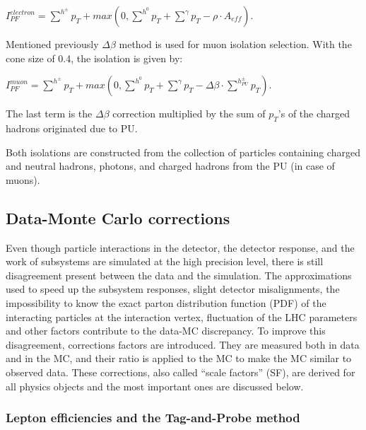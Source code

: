 $I^{electron}_{PF} = \sum^{h^\pm} p_T + max (0, \sum^{h^0} p_T + \sum^\gamma p_T - \rho \cdot A_{eff})$.

Mentioned previously $\Delta \beta$ method is used for muon isolation selection. With the cone size of 0.4, the isolation is given by:

$I^{muon}_{PF} = \sum^{h^\pm} p_T + max (0, \sum^{h^0} p_T + \sum^\gamma p_T - \Delta \beta  \cdot  \sum^{h^\pm_{PU}} p_T)$.

\noindent The last term is the $\Delta \beta$ correction multiplied by the sum of $p_T$'s of the charged hadrons originated due to PU.

Both isolations are constructed from the collection of particles containing charged and neutral hadrons, photons, and charged hadrons from the PU (in case of muons).


\subsection{Data-Monte Carlo corrections}\label{sec:data_mc}

Even though particle interactions in the detector, the detector response, and the work of subsystems are simulated at the high precision level, there is still disagreement present between the data and the simulation. The approximations used to speed up the subsystem responses, slight detector misalignments, the impossibility to know the exact parton distribution function (PDF) of the interacting particles at the interaction vertex, fluctuation of the LHC parameters and other factors contribute to the data-MC discrepancy. To improve this disagreement, corrections factors are introduced. They are measured both in data and in the MC, and their ratio is applied to the MC to make the MC similar to observed data. These corrections, also called ``scale factors'' (SF), are derived for all physics objects and the most important ones are discussed below.

\subsubsection{Lepton efficiencies and the Tag-and-Probe method}\label{sec:TnP}

